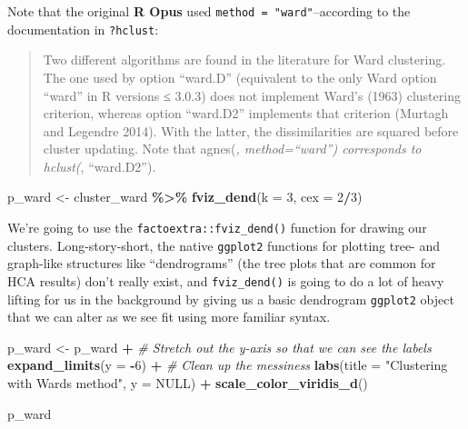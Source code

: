 \documentclass[
]{book}
\newenvironment{Shaded}{\begin{snugshade}}{\end{snugshade}}
\newcommand{\AttributeTok}[1]{\textcolor[rgb]{0.13,0.29,0.53}{#1}}
\newcommand{\CommentTok}[1]{\textcolor[rgb]{0.56,0.35,0.01}{\textit{#1}}}
\newcommand{\ConstantTok}[1]{\textcolor[rgb]{0.56,0.35,0.01}{#1}}
\newcommand{\DecValTok}[1]{\textcolor[rgb]{0.00,0.00,0.81}{#1}}
\newcommand{\FunctionTok}[1]{\textcolor[rgb]{0.13,0.29,0.53}{\textbf{#1}}}
\newcommand{\NormalTok}[1]{#1}
\newcommand{\OtherTok}[1]{\textcolor[rgb]{0.56,0.35,0.01}{#1}}
\newcommand{\SpecialCharTok}[1]{\textcolor[rgb]{0.81,0.36,0.00}{\textbf{#1}}}
\newcommand{\StringTok}[1]{\textcolor[rgb]{0.31,0.60,0.02}{#1}}
\begin{document}
Note that the original \textbf{R Opus} used \texttt{method\ =\ "ward"}--according to the documentation in \texttt{?hclust}:

\begin{quote}
Two different algorithms are found in the literature for Ward clustering. The one used by option ``ward.D'' (equivalent to the only Ward option ``ward'' in R versions ≤ 3.0.3) does not implement Ward's (1963) clustering criterion, whereas option ``ward.D2'' implements that criterion (Murtagh and Legendre 2014). With the latter, the dissimilarities are squared before cluster updating. Note that agnes(\emph{, method=``ward'') corresponds to hclust(}, ``ward.D2'').
\end{quote}

\begin{Shaded}
\begin{Highlighting}[]
\NormalTok{p\_ward }\OtherTok{\textless{}{-}} 
\NormalTok{  cluster\_ward }\SpecialCharTok{\%\textgreater{}\%}
  \FunctionTok{fviz\_dend}\NormalTok{(}\AttributeTok{k =} \DecValTok{3}\NormalTok{, }\AttributeTok{cex =} \DecValTok{2}\SpecialCharTok{/}\DecValTok{3}\NormalTok{)}
\end{Highlighting}
\end{Shaded}

We're going to use the \texttt{factoextra::fviz\_dend()} function for drawing our clusters. Long-story-short, the native \texttt{ggplot2} functions for plotting tree- and graph-like structures like ``dendrograms'' (the tree plots that are common for HCA results) don't really exist, and \texttt{fviz\_dend()} is going to do a lot of heavy lifting for us in the background by giving us a basic dendrogram \texttt{ggplot2} object that we can alter as we see fit using more familiar syntax.

\begin{Shaded}
\begin{Highlighting}[]
\NormalTok{p\_ward }\OtherTok{\textless{}{-}} 
\NormalTok{  p\_ward }\SpecialCharTok{+} 
  \CommentTok{\# Stretch out the y{-}axis so that we can see the labels}
  \FunctionTok{expand\_limits}\NormalTok{(}\AttributeTok{y =} \SpecialCharTok{{-}}\DecValTok{6}\NormalTok{) }\SpecialCharTok{+} 
  \CommentTok{\# Clean up the messiness}
  \FunctionTok{labs}\NormalTok{(}\AttributeTok{title =} \StringTok{"Clustering with Ward\textquotesingle{}s method"}\NormalTok{, }\AttributeTok{y =} \ConstantTok{NULL}\NormalTok{) }\SpecialCharTok{+}
  \FunctionTok{scale\_color\_viridis\_d}\NormalTok{()}

\NormalTok{p\_ward}
\end{Highlighting}
\end{Shaded}
\end{document}
